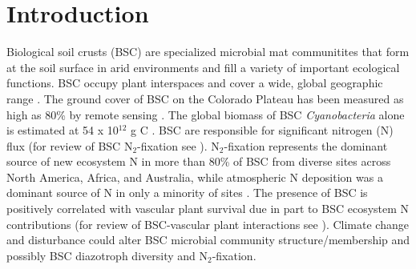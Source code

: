 \section{Introduction}
Biological soil crusts (BSC) are specialized microbial mat communitites that
form at the soil surface in arid environments and fill a variety of important
ecological functions. BSC occupy plant interspaces and cover
a wide, global geographic range \citep{garcia2003estimates}. The ground cover
of BSC on the Colorado Plateau has been measured as high as 80\% by remote
sensing \citep{karnieli2001}. The global biomass of BSC \textit{Cyanobacteria}
alone is estimated at 54 x 10$^{12}$ g C \citep{garcia2003estimates}. BSC 
are responsible for significant nitrogen (N) flux (for review of BSC
N$_{2}$-fixation see \citet{belnap2003}).  N$_{2}$-fixation represents the
dominant source of new ecosystem N in more than 80\% of BSC from diverse sites
across North America, Africa, and Australia, while atmospheric N deposition was
a dominant source of N in only a minority of sites \citep{Evans_1999}. The
presence of BSC is positively correlated with vascular plant survival due in
part to BSC ecosystem N contributions (for review of BSC-vascular plant
interactions see \citet{BelnapVascular}). Climate change and disturbance could
alter BSC microbial community structure/membership and possibly BSC diazotroph
diversity and N$_{2}$-fixation.

